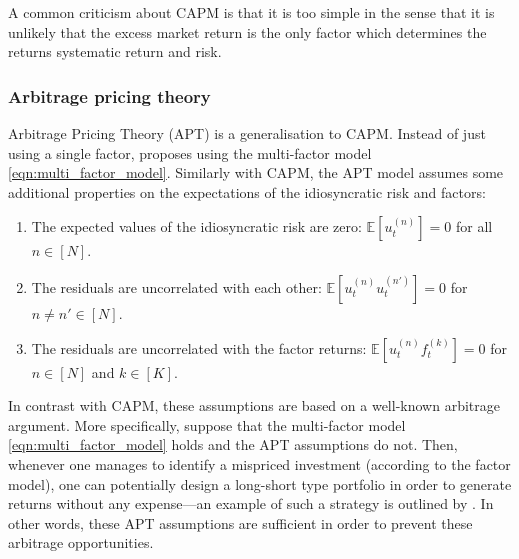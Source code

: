 \documentclass[12pt]{article}
\begin{document}
A common criticism about CAPM is that it is too simple in the sense that it is unlikely that the excess market return is the only factor which determines the returns systematic return and risk.
\subsubsection{Arbitrage pricing theory}
Arbitrage Pricing Theory (APT) is a generalisation to CAPM. Instead of just using a single factor, \cite{ross1976joet} proposes using the multi-factor model \eqref{eqn:multi_factor_model}. Similarly with CAPM, the APT model assumes some additional properties on the expectations of the idiosyncratic risk and factors: 
\begin{enumerate}
	\item The expected values of the idiosyncratic risk are zero: $\mathbb{E}[u_t^{(n)}] = 0$ for all $n \in [N]$.
	\item  The residuals are uncorrelated with each other: $\mathbb{E}[u^{(n)}_t u^{(n')}_t] = 0$ for $n \neq n' \in [N]$.
	\item  The residuals are uncorrelated with the factor returns: $\mathbb{E}[u^{(n)}_t f^{(k)}_t] = 0$ for $n \in [N]$ and $k \in [K]$.
\end{enumerate}
In contrast with CAPM, these assumptions are based on a well-known arbitrage argument. More specifically, suppose that the multi-factor model \eqref{eqn:multi_factor_model} holds and the APT assumptions do not. Then, whenever one manages to identify a mispriced investment (according to the factor model), one can potentially design a long-short type portfolio in order to generate returns without any expense---an example of such a strategy is outlined by \citet[Chapter 7]{grinold1999}. In other words, these APT assumptions are sufficient in order to prevent these arbitrage opportunities.
\end{document}
